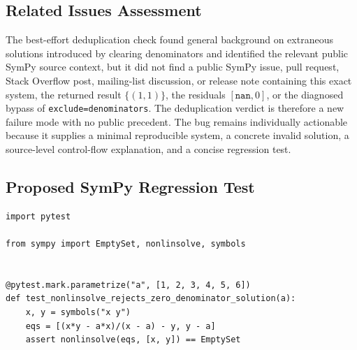 \documentclass[11pt]{article}
\begin{document}
\subsection{Related Issues Assessment}

The best-effort deduplication check found general background on extraneous solutions introduced by clearing denominators and identified the relevant public SymPy source context, but it did not find a public SymPy issue, pull request, Stack Overflow post, mailing-list discussion, or release note containing this exact system, the returned result \(\{(1,1)\}\), the residuals \([\texttt{nan},0]\), or the diagnosed bypass of \texttt{exclude=denominators}.  The deduplication verdict is therefore a new failure mode with no public precedent.  The bug remains individually actionable because it supplies a minimal reproducible system, a concrete invalid solution, a source-level control-flow explanation, and a concise regression test.

\subsection{Proposed SymPy Regression Test}

\medskip

\begin{lstlisting}[style=bugpython]
import pytest

from sympy import EmptySet, nonlinsolve, symbols


@pytest.mark.parametrize("a", [1, 2, 3, 4, 5, 6])
def test_nonlinsolve_rejects_zero_denominator_solution(a):
    x, y = symbols("x y")
    eqs = [(x*y - a*x)/(x - a) - y, y - a]
    assert nonlinsolve(eqs, [x, y]) == EmptySet
\end{lstlisting}
\end{document}

